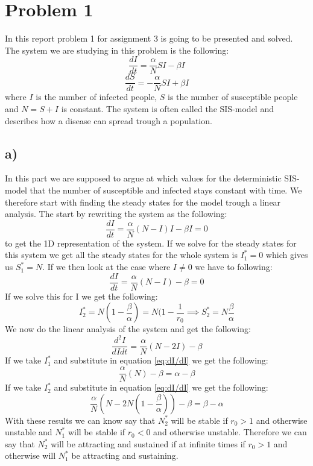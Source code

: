 \documentclass[15pt]{article}
\begin{document}
\section{Problem 1}
In this report problem 1 for assignment 3 is going to be presented and solved. The system we are studying in this problem is the following:
\begin{equation}
	\frac{dI}{dt} = \frac{\alpha}{N}SI - \beta I
	\label{eq:system1}
\end{equation}
\begin{equation}
	\frac{dS}{dt} = -\frac{\alpha}{N}SI + \beta I
	\label{eq:system2}
\end{equation}
where $I$ is the number of infected people, $S$ is the number of susceptible people and $N = S+I$ is constant. The system is often called the SIS-model and describes how a disease can spread trough a population.
\subsection{a)}
In this part we are supposed to argue at which values for the deterministic SIS-model that the number of susceptible and infected stays constant with time. We therefore start with finding the steady states for the model trough a linear analysis. The start by rewriting the system as the following:
\begin{equation}
	\frac{dI}{dt} = \frac{\alpha}{N}(N-I)I - \beta I = 0
	\label{eq:1d system}
\end{equation}
to get the 1D representation of the system. If we solve for the steady states for this system we get all the steady states for the whole system is $I^*_1 = 0$ which gives us $S^*_1 = N$. If we then look at the case where $I \neq 0$ we have to following:
\begin{equation}
	\frac{dI}{dt} = \frac{\alpha}{N}(N-I) - \beta  = 0
\end{equation}
If we solve this for I we get the following:
\begin{equation}
	I^*_2 = N(1-\frac{\beta}{\alpha}) = N(1- \frac{1}{r_0} \implies S^*_2  = N\frac{\beta}{\alpha}
	\label{eq:I_2^*}
\end{equation}
We now do the linear analysis of the system and get the following:
\begin{equation}
	\frac{d^2I}{dIdt} = \frac{\alpha}{N}(N-2I) - \beta
	\label{eq:dI/dI}
\end{equation}
If we take $I_1^*$ and substitute in equation \ref{eq:dI/dI} we get the following:
\begin{equation}
	\frac{\alpha}{N}(N) - \beta = \alpha - \beta
	\label{eq:StabilityI1}
\end{equation}
If we take $I_2^*$ and substitute in equation \ref{eq:dI/dI} we get the following:
\begin{equation}
	\frac{\alpha}{N}(N-2N(1 - \frac{\beta}{\alpha})) - \beta = \beta - \alpha
	\label{eq:StabilityI2}
\end{equation}
With these results we can know say that $N^*_2$ will be stable if $r_0 > 1$ and otherwise unstable and $N_1^*$ will be stable if $r_0 < 0$ and otherwise unstable. Therefore we can say that $N^*_2$ will be attracting and sustained if at infinite times if $r_0 > 1$ and otherwise will $N^*_1$ be attracting and sustaining.
\end{document}
